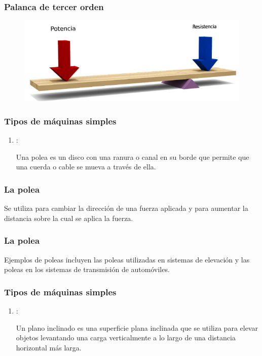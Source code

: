 \documentclass[14pt]{beamer}
\begin{document}
\begin{frame}
\frametitle{Palanca de tercer orden}
\begin{figure}
    \centering
    \includegraphics[scale=0.5]{Imagenes/Palanca_01.png}
\end{figure}
\end{frame}
\begin{frame}
\frametitle{Tipos de máquinas simples}
\begin{enumerate}[<+->]
\conti
\item {}:

Una polea es un disco con una ranura o canal en su borde que permite que una cuerda o cable se mueva a través de ella.
\seti
\end{enumerate}
\end{frame}
\begin{frame}
\frametitle{La polea}
Se utiliza para cambiar la dirección de una fuerza aplicada y para aumentar la distancia sobre la cual se aplica la fuerza.
\end{frame}
\begin{frame}
\frametitle{La polea}
Ejemplos de poleas incluyen las poleas utilizadas en sistemas de elevación y las poleas en los sistemas de transmisión de automóviles.
\end{frame}
\begin{frame}
\frametitle{Tipos de máquinas simples}
\begin{enumerate}[<+->]
\conti
\item {}:

Un plano inclinado es una superficie plana inclinada que se utiliza para elevar objetos levantando una carga verticalmente a lo largo de una distancia horizontal más larga.
\conti
\end{enumerate}
\end{frame}
\end{document}
